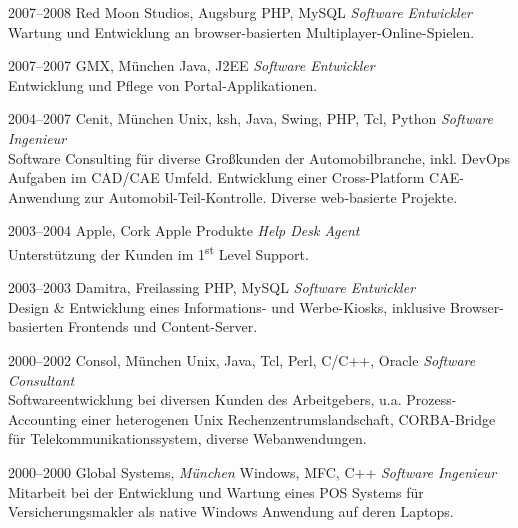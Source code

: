 \documentclass[]{friggeri-cv-a4}
\begin{document}
\begin{entrylist}
\entry
{2007--2008}
{Red Moon Studios, Augsburg}
{PHP, MySQL}
{\emph{Software Entwickler} \\
Wartung und Entwicklung an browser-basierten Multiplayer-Online-Spielen.}
\end{entrylist}


\begin{entrylist}
\entry
{2007--2007}
{GMX, München}
{Java, J2EE}
{\emph{Software Entwickler} \\
Entwicklung und Pflege von Portal-Applikationen.}
\end{entrylist}


\begin{entrylist}
\entry
{2004--2007}
{Cenit, München}
{Unix, ksh, Java, Swing, PHP, Tcl, Python}
{\emph{Software Ingenieur} \\
Software Consulting für diverse Großkunden der Automobilbranche, inkl. DevOps Aufgaben im CAD/CAE Umfeld. Entwicklung einer Cross-Platform CAE-Anwendung zur Automobil-Teil-Kontrolle. Diverse web-basierte Projekte.}
\end{entrylist}


\begin{entrylist}
\entry
{2003--2004}
{Apple, Cork}
{Apple Produkte}
{\emph{Help Desk Agent} \\
Unterstützung der Kunden im 1\textsuperscript{st} Level Support.}
\end{entrylist}

\begin{entrylist}
\entry
{2003--2003}
{Damitra, Freilassing}
{PHP, MySQL}
{\emph{Software Entwickler} \\
Design \& Entwicklung eines Informations- und Werbe-Kiosks, inklusive Browser-basierten Frontends und Content-Server.}
\end{entrylist}

\begin{entrylist}
\entry
{2000--2002}
{Consol, München}
{Unix, Java, Tcl, Perl, C/C++, Oracle}
{\emph{Software Consultant} \\
Softwareentwicklung bei diversen Kunden des Arbeitgebers, u.a. Prozess-Accounting einer heterogenen Unix Rechenzentrumslandschaft, CORBA-Bridge für Telekommunikationssystem, diverse Webanwendungen.}
\end{entrylist}

\begin{entrylist}
\entry
{2000--2000}
{Global Systems, \emph{München}}
{Windows, MFC, C++}
{\emph{Software Ingenieur} \\
Mitarbeit bei der Entwicklung und Wartung eines POS Systems für Versicherungsmakler als native Windows Anwendung auf deren Laptops.}
\end{entrylist}
\end{document}

